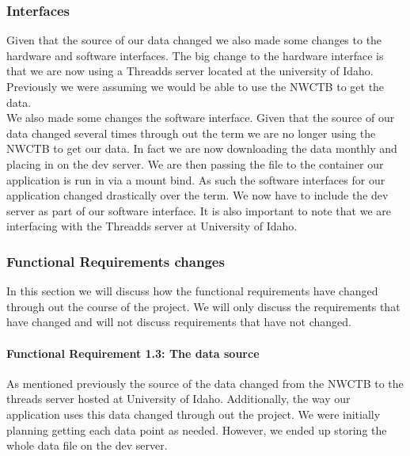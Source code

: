 \documentclass[onecolumn, draftclsnofoot,10pt, compsoc]{article}
\begin{document}
        \subsubsection{Interfaces}
        Given that the source of our data changed we also made some changes to the hardware and software interfaces. The big change to the hardware interface is that we are now using a Threadds server located at the university of Idaho. Previously we were assuming we would be able to use the NWCTB to get the data.\\
        
        We also made some changes the software interface. Given that the source of our data changed several times through out the term we are no longer using the NWCTB to get our data. In fact we are now downloading the data monthly and placing in on the dev server. We are then passing the file to the container our application is run in via a mount bind. As such the software interfaces for our application changed drastically over the term. We now have to include the dev server as part of our software interface. It is also important to note that we are interfacing with the Threadds server at University of Idaho.\\ 
        
        \subsubsection{Functional Requirements changes}
            In this section we will discuss how the functional requirements have changed through out the course of the project. We will only discuss the requirements that have changed and will not discuss requirements that have not changed.\\ 
            
		    \paragraph{Functional Requirement 1.3: The data source}
		    As mentioned previously the source of the data changed from the NWCTB to the threads server hosted at University of Idaho. Additionally, the way our application uses this data changed through out the project. We were initially planning getting each data point as needed. However, we ended up storing the whole data file on the dev server.\\
		    
\end{document}
